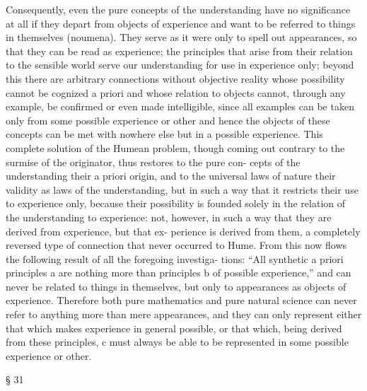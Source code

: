 Consequently, even the pure concepts of the understanding have no
signiﬁcance at all if they depart from objects of experience and want to
be referred to things in themselves (noumena). They serve as it were
only to spell out appearances, so that they can be read as experience;
the principles that arise from their relation to the sensible world serve
our understanding for use in experience only; beyond this there are
arbitrary connections without objective reality whose possibility cannot
be cognized a priori and whose relation to objects cannot, through any
example, be conﬁrmed or even made intelligible, since all examples can
be taken only from some possible experience or other and hence the
objects of these concepts can be met with nowhere else but in a possible
experience.
This complete solution of the Humean problem, though coming out
contrary to the surmise of the originator, thus restores to the pure con-
cepts of the understanding their a priori origin, and to the universal laws
of nature their validity as laws of the understanding, but in such a way
that it restricts their use to experience only, because their possibility is
founded solely in the relation of the understanding to experience: not,
however, in such a way that they are derived from experience, but that ex-
perience is derived from them, a completely reversed type of connection
that never occurred to Hume.
From this now ﬂows the following result of all the foregoing investiga-
tions: “All synthetic a priori principles a are nothing more than principles b
of possible experience,” and can never be related to things in themselves,
but only to appearances as objects of experience. Therefore both pure
mathematics and pure natural science can never refer to anything more
than mere appearances, and they can only represent either that which
makes experience in general possible, or that which, being derived from
these principles, c must always be able to be represented in some possible
experience or other.

§ 31

